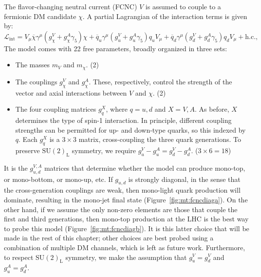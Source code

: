 The flavor-changing neutral current (FCNC) $V$ is assumed to couple to a fermionic DM candidate $\chi$.
A partial Lagrangian of the interaction terms is given by:
\begin{equation}
\mathcal{L}_\text{int}=  V_\mu  \overline\chi \gamma^\mu (  g^V_{\chi} + g^A_{\chi} \gamma_5 ) \chi
                           + \overline{q}_u \gamma^\mu
                           ( g^V_u + g^A_u \gamma_5 ) q_u V_\mu
                           + \overline{q}_{d} \gamma^\mu
                           (  g^V_{d} + g^A_{d} \gamma_5 ) q_d V_\mu
                           + \text{h.c.},
    \label{eq:Lfcnc}
\end{equation}
The model comes with 22 free parameters, broadly organized in three sets:
\begin{itemize}
    \item The masses $m_V$ and $m_\chi$. (2)
    \item The couplings $g_\chi^V$ and $g_\chi^A$. These, respectively, control the strength of the vector and axial interactions between $V$ and $\chi$. (2)
    \item The four coupling matrices $g_{q}^{X}$, where $q=u,d$ and $X=V,A$.
          As before, $X$ determines the type of spin-1 interaction.
          In principle, different coupling strengths can be permitted for up- and down-type quarks, so this indexed by $q$.
          Each $g_{q}^{X}$ is a $3\times3$ matrix, cross-coupling the three quark generations.
          To preserve $\mathrm{SU}(2)_\mathrm{L}$ symmetry, we require $g_u^V - g_u^A = g_d^V - g_d^A$. ($3\times6=18$)
\end{itemize}

It is the $g_{u,d}^{V,A}$ matrices that determine whether the model can produce mono-top, or mono-bottom, or mono-up, etc.
If $g_{u,d}$ is strongly diagonal, in the sense that the cross-generation couplings are weak, then mono-light quark production will dominate, resulting in the mono-jet final state (Figure~\ref{fig:mt:fcncdiaga}).
On the other hand, if we assume the only non-zero elements are those that couple the first and third generations, then mono-top production at the LHC is the best way to probe this model (Figure~\ref{fig:mt:fcncdiagb}).
It is this latter choice that will be made in the rest of this chapter; other choices are best probed using a combination of multiple DM channels, which is left as future work.
Furthermore, to respect $\mathrm{SU}(2)_\mathrm{L}$ symmetry, we make the assumption that $g_u^V = g_d^V$ and $g_u^A = g_d^A$.

